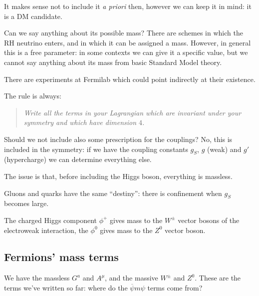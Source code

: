 \documentclass[main.tex]{subfiles}
\begin{document}
It makes sense not to include it \emph{a priori} then, however we can keep it in mind: it is a DM candidate.

Can we say anything about its possible mass? There are schemes in which the RH neutrino enters, and in which it can be assigned a mass. However, in general this is a free parameter: in some contexts we can give it a specific value, but we cannot say anything about its mass from basic Standard Model theory.

There are experiments at Fermilab which could point indirectly at their existence.

The rule is always: 
\begin{quote}
    \emph{Write all the terms in your Lagrangian which are invariant under your symmetry and which have dimension \( 4\).}
\end{quote}

Should we not include also some prescription for the couplings? 
No, this is included in the symmetry: if we have the coupling constants \(g_S\), \(g\) (weak) and \(g'\) (hypercharge) we can determine everything else.

The issue is that, before including the Higgs boson, everything is massless.

Gluons and quarks have the same ``destiny'': there is confinement when \(g_S\) becomes large.



The charged Higgs component \(\phi^{+}\) gives mass to the \(W^{\pm}\) vector bosons of the electroweak interaction, the \(\phi^{0}\) gives mass to the \(Z^{0}\) vector boson. 


\subsection{Fermions' mass terms}

We have the massless \(G^{a}\) and \(A^{\mu }\), and the massive \(W^{\pm}\) and \(Z^{0}\). These are the terms we've written so far: where do the \(\overline{\psi} m  \psi \) terms come from?
\end{document}
